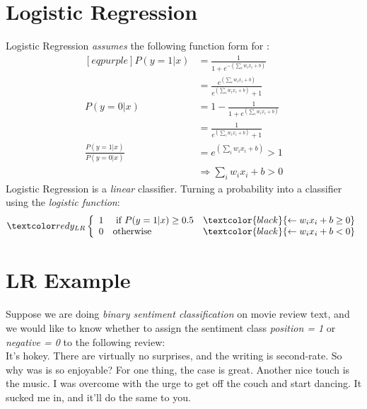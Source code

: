 \documentclass[
	number={4},
	title={Logistic Regression}
]{cs584notes}
\begin{document}
\section{Logistic Regression}\label{sec:logistic-regression}
Logistic Regression \emph{assumes} the following function form for :
\data{\[ P(y=1|x) = \frac{1}{1+e^{-\left( \sum_{i}w_{i}x_{i} + b \right)}} \]}
\begin{equation*}
\begin{aligned}[eqpurple]
	P(y=1|x) &= \frac{1}{1+e^{-\left( \sum_{i}w_{i}x_{i} + b \right)}}\\
			 &= \frac{e^{\left( \sum_{i}w_{i}x_{i} + b \right)}}{e^{\left( \sum_{i}w_{i}x_{i} + b \right)} + 1}\\
	P(y=0|x) &= 1 - \frac{1}{1+e^{\left( \sum_{i}w_{i}x_{i} + b \right)}}\\
			 &= \frac{1}{e^{\left( \sum_{i}w_{i}x_{i} + b \right)} + 1}\\
	\frac{P(y=1|x)}{P(y=0|x)} &= e^{\left( \sum_{i}w_{i}x_{i} + b \right)} > 1\\
	&\Rightarrow \sum_{i} w_{i}x_{i} + b > 0
\end{aligned}
\end{equation*}
Logistic Regression is a \emph{linear} classifier.
Turning a probability into a classifier using the \emph{logistic function}:
\[ \data{ y_{LR}\left\{ \begin{array}{clr}
	1 & \mbox{ if } P(y=1|x) \geq 0.5 & \textcolor{black}{\leftarrow w_{i}x_{i} + b \geq 0}\\
	0 & \mbox{otherwise} & \textcolor{black}{\leftarrow w_{i}x_{i} + b < 0}
\end{array} \right. } \]

\section{LR Example}\label{sec:lr-example}
Suppose we are doing \emph{binary sentiment classification} on movie review text, and we would like to know whether to assign the sentiment class \emph{position = 1} or \emph{negative = 0} to the following review:\\

It's hokey.
There are virtually no surprises, and the writing is second-rate.
So why was is so enjoyable?
For one thing, the case is great.
Another nice touch is the music.
I was overcome with the urge to get off the couch and start dancing.
It sucked me in, and it'll do the same to you.
\end{document}
